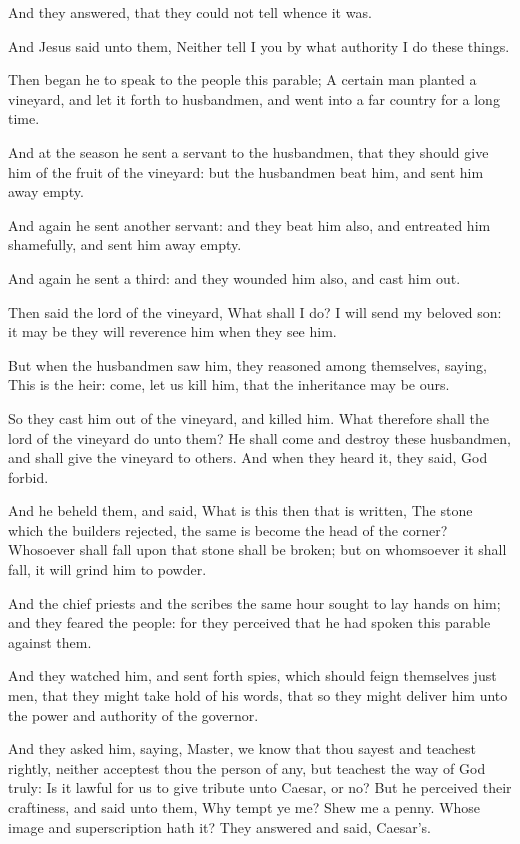 \verse And they answered, that they could not tell whence it was.

\verse And Jesus said unto them, Neither tell I you by what authority I do these things.

\verse Then began he to speak to the people this parable; A certain man planted a vineyard, and let it forth to husbandmen, and went into a far country for a long time.

\verse And at the season he sent a servant to the husbandmen, that they should give him of the fruit of the vineyard: but the husbandmen beat him, and sent him away empty.

\verse And again he sent another servant: and they beat him also, and entreated him shamefully, and sent him away empty.

\verse And again he sent a third: and they wounded him also, and cast him out.

\verse Then said the lord of the vineyard, What shall I do? I will send my beloved son: it may be they will reverence him when they see him.

\verse But when the husbandmen saw him, they reasoned among themselves, saying, This is the heir: come, let us kill him, that the inheritance may be ours.

\verse So they cast him out of the vineyard, and killed him. What therefore shall the lord of the vineyard do unto them?  \verse He shall come and destroy these husbandmen, and shall give the vineyard to others. And when they heard it, they said, God forbid.

\verse And he beheld them, and said, What is this then that is written, The stone which the builders rejected, the same is become the head of the corner?  \verse Whosoever shall fall upon that stone shall be broken; but on whomsoever it shall fall, it will grind him to powder.

\verse And the chief priests and the scribes the same hour sought to lay hands on him; and they feared the people: for they perceived that he had spoken this parable against them.

\verse And they watched him, and sent forth spies, which should feign themselves just men, that they might take hold of his words, that so they might deliver him unto the power and authority of the governor.

\verse And they asked him, saying, Master, we know that thou sayest and teachest rightly, neither acceptest thou the person of any, but teachest the way of God truly: \verse Is it lawful for us to give tribute unto Caesar, or no?  \verse But he perceived their craftiness, and said unto them, Why tempt ye me?  \verse Shew me a penny. Whose image and superscription hath it? They answered and said, Caesar's.


